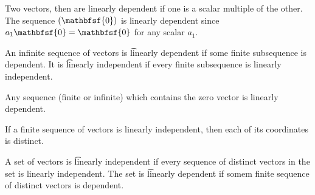 Two vectors, then are linearly dependent if one is a scalar multiple of the other.
The sequence $(\mathbfsf{0})$ is linearly dependent since $a_1 \mathbfsf{0} = \mathbfsf{0}$ for any scalar $a_1$.

An infinite sequence of vectors is \t{linearly dependent} if some finite subsequence is dependent.
It is \t{linearly independent} if every finite subsequence is linearly independent.

Any sequence (finite or infinite) which contains the zero vector is linearly dependent.

If a finite sequence of vectors is linearly independent, then each of its coordinates is distinct.

A set of vectors is \t{linearly independent} if every sequence of distinct vectors in the set is linearly independent.
The set is \t{linearly dependent} if somem finite sequence of distinct vectors is dependent.
